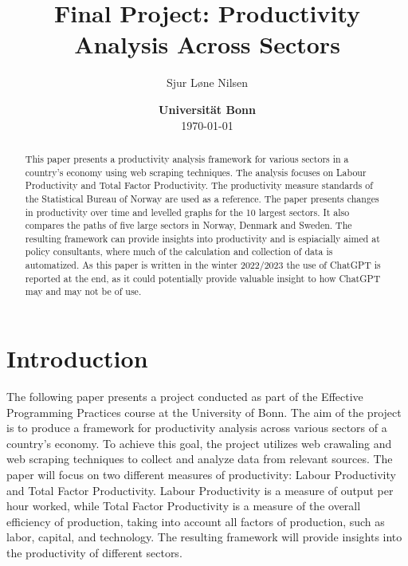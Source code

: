 \documentclass[11pt, a4paper, leqno]{article}
\begin{document}
\title{Final Project: Productivity Analysis Across Sectors}

\author{Sjur Løne Nilsen}

\date{
    {\bf Universität Bonn}
    \\[1ex]
    \today
}

\maketitle


\begin{abstract}
    This paper presents a productivity analysis framework for various sectors in a country's 
    economy using web scraping techniques. The analysis focuses on Labour Productivity and 
    Total Factor Productivity. The productivity measure standards of the Statistical Bureau 
    of Norway are used as a reference. The paper presents changes in productivity over time 
    and levelled graphs for the 10 largest sectors. It also compares the paths of five large
    sectors in Norway, Denmark and Sweden. The resulting framework can provide 
    insights into productivity and is espiacially aimed at policy consultants, where much of
    the calculation and collection of data is automatized. As this paper is written in the winter 
    2022/2023 the use of ChatGPT is reported at the end, as it could potentially provide valuable 
    insight to how ChatGPT may and may not be of use.
\end{abstract}

\clearpage


\section{Introduction} %
\label{sec:introduction}

The following paper presents a project conducted as part of the Effective Programming Practices 
course at the University of Bonn. The aim of the project is to produce a framework for 
productivity analysis across various sectors of a country's economy. To achieve this goal, the 
project utilizes web crawaling and web scraping techniques to collect and analyze data from relevant sources. The
 paper will focus on two different measures of productivity: Labour Productivity and Total 
 Factor Productivity. Labour Productivity is a measure of output per hour worked, while Total 
 Factor Productivity is a measure of the overall efficiency of production, taking into account 
 all factors of production, such as labor, capital, and technology. The resulting framework 
 will provide insights into the productivity of different sectors.
\end{document}
